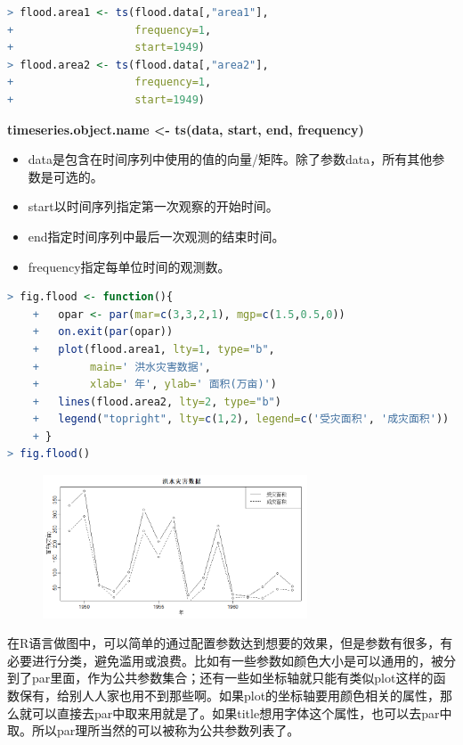 \documentclass[11pt,a4paper,oneside]{book}
\begin{document}
\begin{lstlisting}[language=r]
> flood.area1 <- ts(flood.data[,"area1"],
+                   frequency=1,
+                   start=1949)
> flood.area2 <- ts(flood.data[,"area2"],
+                   frequency=1,
+                   start=1949)
\end{lstlisting}
\begin{tcolorbox}[colback=pink!10!white,colframe=pink!100!black]
\textbf{timeseries.object.name <-  ts(data, start, end, frequency)}
	\begin{itemize}
		\item data是包含在时间序列中使用的值的向量/矩阵。除了参数data，所有其他参数是可选的。
		\item start以时间序列指定第一次观察的开始时间。
		\item end指定时间序列中最后一次观测的结束时间。
		\item frequency指定每单位时间的观测数。
	\end{itemize}
\end{tcolorbox}

\begin{lstlisting}[language=r]
> fig.flood <- function(){
	+   opar <- par(mar=c(3,3,2,1), mgp=c(1.5,0.5,0))
	+   on.exit(par(opar))
	+   plot(flood.area1, lty=1, type="b",
	+        main=' 洪水灾害数据',
	+        xlab=' 年', ylab=' 面积(万亩)')
	+   lines(flood.area2, lty=2, type="b")
	+   legend("topright", lty=c(1,2), legend=c('受灾面积', '成灾面积'))
	+ }
> fig.flood()
\end{lstlisting}
\begin{figure}[H]
	\centering
	\includegraphics[width=0.7\textwidth]{1.png}
\end{figure}
在R语言做图中，可以简单的通过配置参数达到想要的效果，但是参数有很多，有必要进行分类，避免滥用或浪费。比如有一些参数如颜色大小是可以通用的，被分到了par里面，作为公共参数集合；还有一些如坐标轴就只能有类似plot这样的函数保有，给别人人家也用不到那些啊。如果plot的坐标轴要用颜色相关的属性，那么就可以直接去par中取来用就是了。如果title想用字体这个属性，也可以去par中取。所以par理所当然的可以被称为公共参数列表了。
\end{document}
